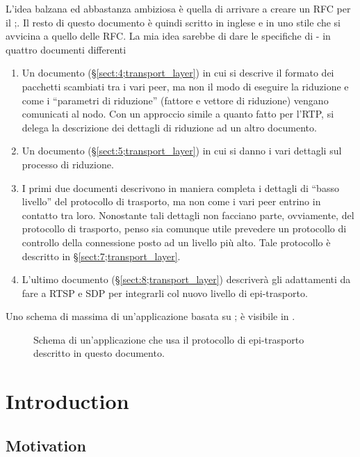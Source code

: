 \documentclass{rfc}
\begin{document}
L'idea balzana ed abbastanza ambiziosa \`e quella di arrivare a creare
un RFC per il \ppmtp;.  Il resto di questo documento \`e quindi scritto
in inglese e in uno stile che si avvicina a quello delle RFC.  La mia
idea sarebbe di dare le specifiche di \medusa- in quattro documenti
differenti

\begin{enumerate}
\item
Un documento (\S\ref{sect:4;transport_layer}) in cui si descrive il
formato dei pacchetti scambiati tra i vari peer, ma non il modo di
eseguire la riduzione e come i ``parametri di riduzione'' (fattore e
vettore di riduzione) vengano comunicati al nodo.  Con un approccio
simile a quanto fatto per l'RTP, si delega la descrizione dei dettagli
di riduzione ad un altro documento.
\item
Un documento (\S\ref{sect:5;transport_layer}) in cui si danno i vari
dettagli sul processo di riduzione.
\item
I primi due documenti descrivono in maniera completa i dettagli di
``basso livello'' del protocollo di trasporto, ma non come i vari peer
entrino in contatto tra loro.  Nonostante tali dettagli non facciano
parte, ovviamente, del protocollo di trasporto, penso sia comunque
utile prevedere un protocollo di controllo della connessione posto ad
un livello pi\`u alto.  Tale protocollo \`e descritto in
\S\ref{sect:7;transport_layer}.
\item
L'ultimo documento (\S\ref{sect:8;transport_layer}) descriver\`a gli
adattamenti da fare a RTSP e SDP per integrarli col nuovo livello di
epi-trasporto.
\end{enumerate}
%
Uno schema di massima di un'applicazione basata su \ppmtp; \`e
visibile in .

\begin{figure}
\centerline{}
\caption{Schema di un'applicazione che usa il protocollo di
  epi-trasporto descritto in questo documento.
\label{fig:cpptp}}
\end{figure}
%

\chapter{Introduction}
\label{sect:3;transport_layer}

\section{Motivation}
\label{sub:3.0;transport_layer}
\end{document}
